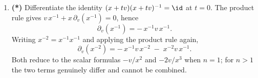\begin{exercisesolution}
\begin{enumerate}[label=\textbf{(\alph*)}]
\[      \partial_v\Tr(x^2) = \Tr(xv+vx) = 2\Tr(xv),\]
    the last using cyclicity of the trace. Note that $\partial_v(x^2) \neq 2xv$: matrices do not
    commute, and the familiar one-variable answer is precisely what fails.
  \item \textbf{(*)} Differentiate the identity $(x+tv)(x+tv)^{-1} = \id$ at $t=0$. The product
    rule gives $v\,x^{-1} + x\,\partial_v(x^{-1}) = 0$, hence
    \[\partial_v(x^{-1}) = -\,x^{-1}v\,x^{-1}.\]
    Writing $x^{-2} = x^{-1}x^{-1}$ and applying the product rule again,
    \[\partial_v(x^{-2}) = -\,x^{-1}v\,x^{-2} \;-\; x^{-2}v\,x^{-1}.\]
    Both reduce to the scalar formulas $-v/x^2$ and $-2v/x^3$ when $n=1$; for $n>1$ the two terms
    genuinely differ and cannot be combined.
\end{enumerate}
\end{exercisesolution}

